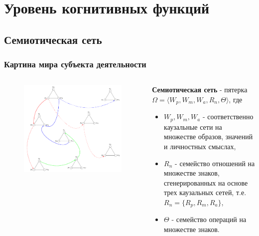 \documentclass[default]{beamer}
\begin{document}
	\section{Уровень когнитивных функций}
	\subsection{Семиотическая сеть}
	\begin{frame}
		\frametitle{Картина мира субъекта деятельности}
		
		\begin{columns}
			\begin{column}{0.55\textwidth}
				\begin{figure}
					\includegraphics[width=\textwidth]{signs/signs_net}
				\end{figure}
			\end{column}
			\begin{column}{0.45\textwidth}
				\textbf{Семиотическая сеть} - пятерка $\Omega=\langle W_p, W_m, W_a, R_n, \Theta \rangle$, где
				\begin{itemize}
					\item $W_p, W_m, W_a$ - соответственно каузальные сети на множестве образов, значений и личностных смыслах,
					\item $R_n$ - семейство отношений на множестве знаков, сгенерированных на основе трех каузальных сетей, т.е. $R_n=\{R_p, R_m, R_a\}$,
					\item $\Theta$ - семейство операций на множестве знаков.
				\end{itemize}
			\end{column}
		\end{columns}
		\nocite{*}
		\printbibliography[keyword={symbsign}, resetnumbers=true]
	\end{frame}	
	
\end{document}
